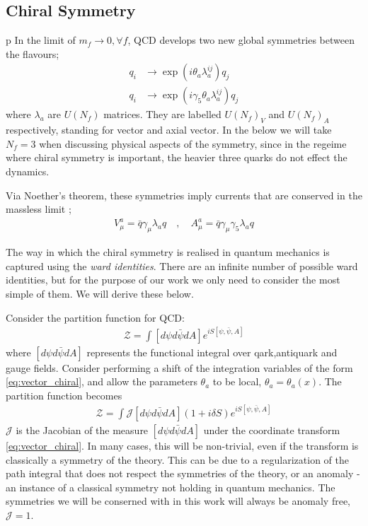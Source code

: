 \subsection{Chiral Symmetry}
p
In the limit of $m_f\to 0,\forall f$, QCD develops two new global symmetries between the flavours;
\begin{align}
  \label{eq:vector_chiral}
  q_i &\to \exp(i\theta_a \lambda^{ij}_a) q_j \\
  q_i &\to \exp(i\gamma_5 \theta_a \lambda^{ij}_a) q_j
\end{align}
where $\lambda_a$ are $U(N_f)$ matrices. They are labelled $U(N_f)_V$ and $U(N_f)_A$ respectively, standing for vector and axial vector.
In the below we will take $N_f=3$ when discussing physical aspects of the symmetry, since in the regeime where chiral symmetry is important, the heavier three quarks do not effect the dynamics.

Via Noether's theorem, these symmetries imply currents that are conserved in the massless limit \cite{Scherer:2002tk};
\begin{align}
    \label{eq:chiralcurrents}
  V_{\mu}^a = \bar{q} \gamma_{\mu} \lambda_a q \quad,\quad 
  A_{\mu}^a = \bar{q} \gamma_{\mu} \gamma_5 \lambda_a q
\end{align}

The way in which the chiral symmetry is realised in quantum mechanics is captured using the {\it{ward identities}}. There are an infinite number of possible ward identities, but for the purpose of our work we only need to consider the most simple of them. We will derive these below.

Consider the partition function for QCD:
\begin{align}
  \mathcal{Z} = \int [d\psi d\bar{\psi} dA] e^{iS[\psi,\bar{\psi},A]}
\end{align}
where $[d\psi d\bar{\psi} dA]$ represents the functional integral over qark,antiquark and gauge fields. Consider performing a shift of the integration variables of the form \eqref{eq:vector_chiral}, and allow the parameters $\theta_a$ to be local, $\theta_a=\theta_a(x)$. The partition function becomes
\begin{align}
  \mathcal{Z} = \int \mathcal{J} [d\psi d\bar{\psi} dA] ( 1 + i\delta S ) e^{iS[\psi,\bar{\psi},A]}
  \label{eq:partition_transformed}
\end{align}
$\mathcal{J}$ is the Jacobian of the measure $[d\psi d\bar{\psi} dA]$ under the coordinate transform \eqref{eq:vector_chiral}. In many cases, this will be non-trivial, even if the transform is classically a symmetry of the theory. This can be due to a regularization of the path integral that does not respect the symmetries of the theory, or an anomaly - an instance of a classical symmetry not holding in quantum mechanics. The symmetries we will be conserned with in this work will always be anomaly free, $\mathcal{J}=1$.

